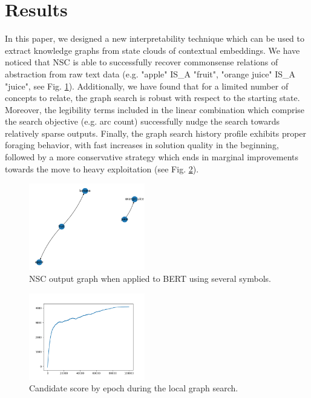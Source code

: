 \section{Results}\label{sec:results}

In this paper, we designed a new interpretability technique which can be used to extract knowledge graphs from state clouds of contextual embeddings. We have noticed that NSC is able to successfully recover commonsense relations of abstraction from raw text data (e.g. "apple" IS\_A "fruit", "orange juice" IS\_A "juice", see Fig. \ref{fig:nsc_output_graph}). Additionally, we have found that for a limited number of concepts to relate, the graph search is robust with respect to the starting state. Moreover, the legibility terms included in the linear combination which comprise the search objective (e.g. arc count) successfully nudge the search towards relatively sparse outputs. Finally, the graph search history profile exhibits proper foraging behavior, with fast increases in solution quality in the beginning, followed by a more conservative strategy which ends in marginal improvements towards the move to heavy exploitation (see Fig. \ref{fig:nsc_score_history}).

\begin{figure}[h]
    \centering
    \includegraphics[width=0.45\textwidth]{img/distinct graphs.png}
    \caption{NSC output graph when applied to BERT using several symbols.}\label{fig:nsc_output_graph}
\end{figure}

\begin{figure}[h]
    \centering
    \includegraphics[width=0.45\textwidth]{img/score1.png}
    \caption{Candidate score by epoch during the local graph search.}\label{fig:nsc_score_history}
\end{figure}